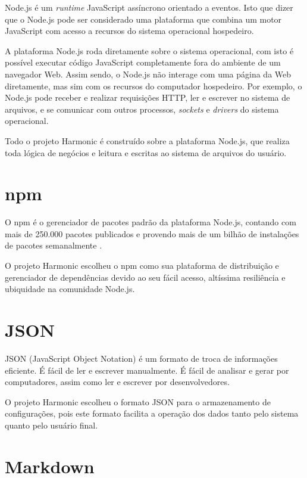 \documentclass[ppginf, pep]{esinucpel}
\begin{document}
Node.js é um \textit{runtime} JavaScript assíncrono orientado a eventos. \cite{nodejs} Isto que dizer que o Node.js pode ser considerado uma plataforma que combina um motor JavaScript com acesso a recursos do sistema operacional hospedeiro.

A plataforma Node.js roda diretamente sobre o sistema operacional, com isto é possível executar código JavaScript completamente fora do ambiente de um navegador Web. Assim sendo, o Node.js não interage com uma página da Web diretamente, mas sim com os recursos do computador hospedeiro. Por exemplo, o Node.js pode receber e realizar requisições HTTP, ler e escrever no sistema de arquivos, e se comunicar com outros processos, \textit{sockets} e \textit{drivers} do sistema operacional. \cite{javaworld}

Todo o projeto Harmonic é construído sobre a plataforma Node.js, que realiza toda lógica de negócios e leitura e escritas ao sistema de arquivos do usuário.

\section{npm}

O npm é o gerenciador de pacotes padrão da plataforma Node.js, contando com mais de 250.000 pacotes publicados \cite{npm} e provendo mais de um bilhão de instalações de pacotes semanalmente \cite{npm_packages}.

O projeto Harmonic escolheu o npm como sua plataforma de distribuição e gerenciador de dependências devido ao seu fácil acesso, altíssima resiliência e ubiquidade na comunidade Node.js.

\section{JSON}

JSON (JavaScript Object Notation) é um formato de troca de informações eficiente. É fácil de ler e escrever manualmente. É fácil de analisar e gerar por computadores, assim como ler e escrever por desenvolvedores. \cite{json}

O projeto Harmonic escolheu o formato JSON para o armazenamento de configurações, pois este formato facilita a operação dos dados tanto pelo sistema quanto pelo usuário final.

\section{Markdown}
\end{document}
